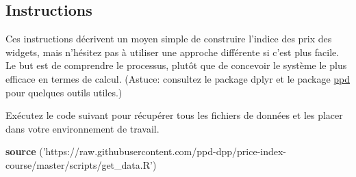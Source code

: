 \documentclass[]{article}
\newenvironment{Shaded}{\begin{snugshade}}{\end{snugshade}}
\newcommand{\KeywordTok}[1]{\textcolor[rgb]{0.13,0.29,0.53}{\textbf{#1}}}
\newcommand{\NormalTok}[1]{#1}
\newcommand{\StringTok}[1]{\textcolor[rgb]{0.31,0.60,0.02}{#1}}
\begin{document}
\hypertarget{instructions}{%
\subsection{Instructions}\label{instructions}}

Ces instructions décrivent un moyen simple de construire l'indice des prix des widgets, mais n'hésitez pas à utiliser une approche différente si c'est plus facile. Le but est de comprendre le processus, plutôt que de concevoir le système le plus efficace en termes de calcul. (Astuce: consultez le package dplyr et le package \href{https://github.com/marberts/ppd}{ppd} pour quelques outils utiles.)

Exécutez le code suivant pour récupérer tous les fichiers de données et les placer dans votre environnement de travail.

\begin{Shaded}
\begin{Highlighting}[]
\KeywordTok{source}\NormalTok{ (}\StringTok{'https://raw.githubusercontent.com/ppd-dpp/price-index-course/master/scripts/get_data.R'}\NormalTok{)}
\end{Highlighting}
\end{Shaded}
\end{document}
